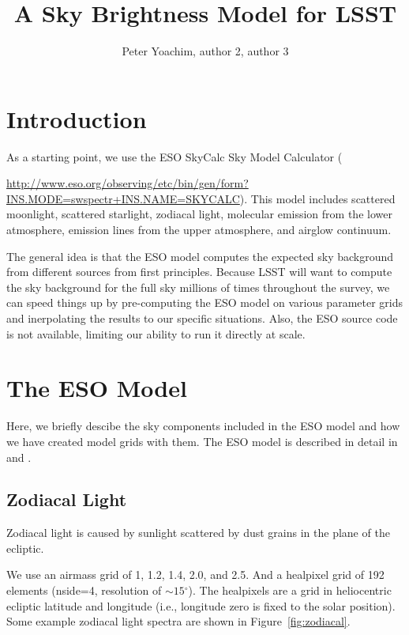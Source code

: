 \documentclass{emulateapj}  %
\newcommand\degree{{^\circ}}
\begin{document}
\title{A Sky Brightness Model for LSST}


\author{Peter Yoachim, author 2, author 3}


\begin{abstract}

\end{abstract}


\section{Introduction}

As a starting point, we use the ESO SkyCalc Sky Model Calculator ({\url{http://www.eso.org/observing/etc/bin/gen/form?INS.MODE=swspectr+INS.NAME=SKYCALC}).  This model includes scattered moonlight, scattered starlight, zodiacal light, molecular emission from the lower atmosphere, emission lines from the upper atmosphere, and airglow continuum.  

The general idea is that the ESO model computes the expected sky background from different sources from first principles. Because LSST will want to compute the sky background for the full sky millions of times throughout the survey, we can speed things up by pre-computing the ESO model on various parameter grids and inerpolating the results to our specific situations. Also, the ESO source code is not available, limiting our ability to run it directly at scale.

\section{The ESO Model}
Here, we briefly descibe the sky components included in the ESO model and how we have created model grids with them. The ESO model is described in detail in  and \citet{Jones13}.

\subsection{Zodiacal Light}
Zodiacal light is caused by sunlight scattered by dust grains in the plane of the ecliptic.  

We use an airmass grid of 1, 1.2, 1.4, 2.0, and 2.5. And a healpixel grid of 192 elements (nside=4, resolution of $\sim15\degree$).  The healpixels are a grid in heliocentric ecliptic latitude and longitude (i.e., longitude zero is fixed to the solar position).  Some example zodiacal light spectra are shown in Figure~\ref{fig:zodiacal}.

}
\end{document}

